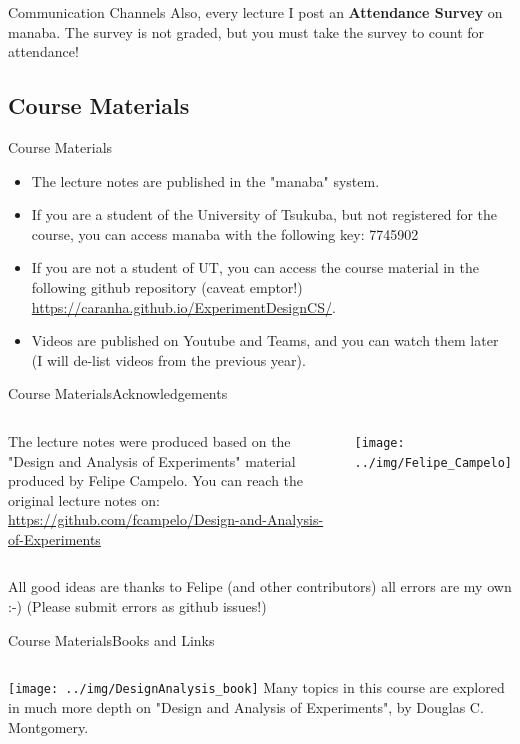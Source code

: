 \documentclass[aspectratio=169]{beamer}
\begin{document}
\begin{CJK}{UTF8}{ipxm}
\begin{frame}{Communication Channels}{}
  Also, every lecture I post an {\bf Attendance Survey} on manaba. The survey is not graded, but \alert{you must take the survey to count for attendance!}
\end{frame}

\subsection{Course Materials}
\begin{frame}{Course Materials}
  \begin{itemize}
    \item The lecture notes are published in the "manaba" system.\medskip

    \item If you are a student of the University of Tsukuba, but not registered for the course, you can access manaba with the following key: \alert{7745902}\medskip

    \item If you are not a student of UT, you can access the course material in the following github repository (caveat emptor!)\\
    \url{https://caranha.github.io/ExperimentDesignCS/}.\medskip

    \item Videos are published on Youtube and Teams, and you can watch them later (I will de-list videos from the previous year).
  \end{itemize}
\end{frame}

\begin{frame}{Course Materials}{Acknowledgements}
  \begin{columns}
    The lecture notes were produced based on the "Design and Analysis of Experiments" material produced by Felipe Campelo. You can reach the original lecture notes on: \url{https://github.com/fcampelo/Design-and-Analysis-of-Experiments}

    \hfill\texttt{[image: ../img/Felipe\_Campelo]}
  \end{columns}
  \bigskip

  All good ideas are thanks to Felipe (and other contributors) all errors are my own :-) (Please submit errors as github issues!)
\end{frame}

\begin{frame}{Course Materials}{Books and Links}
  \begin{columns}
    \texttt{[image: ../img/DesignAnalysis\_book]}
    Many topics in this course are explored in much more depth on "Design and Analysis of Experiments", by Douglas C. Montgomery.
  \end{columns}
  \vspace{1cm}


\end{frame}
\end{CJK}
\end{document}
